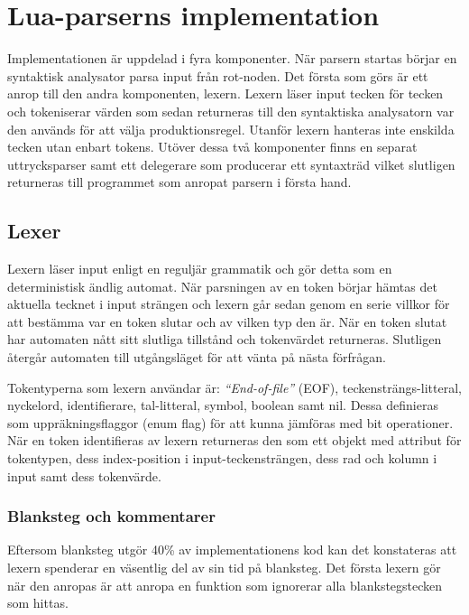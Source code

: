 \section{Lua-parserns implementation}

Implementationen är uppdelad i fyra komponenter. När parsern startas börjar
en syntaktisk analysator parsa input från rot-noden.  Det första som görs är
ett anrop till den andra komponenten, lexern. Lexern läser input tecken för
tecken och tokeniserar värden som sedan returneras till den syntaktiska
analysatorn var den används för att välja produktionsregel. Utanför lexern
hanteras inte enskilda tecken utan enbart tokens.  Utöver dessa två
komponenter finns en separat uttrycksparser samt ett delegerare som producerar
ett syntaxträd vilket slutligen returneras till programmet som anropat parsern
i första hand.

\subsection{Lexer}

Lexern läser input enligt en reguljär grammatik och gör detta som en
deterministisk ändlig automat. När parsningen av en token börjar hämtas det
aktuella tecknet i input strängen och lexern går sedan genom en serie villkor
för att bestämma var en token slutar och av vilken typ den är. När en token
slutat har automaten nått sitt slutliga tillstånd och tokenvärdet returneras.
Slutligen återgår automaten till utgångsläget för att vänta på nästa
förfrågan.

Tokentyperna som lexern användar är: \textit{``End-of-file''} (EOF),
teckensträngs-litteral, nyckelord, identifierare, tal-litteral, symbol,
boolean samt nil. Dessa definieras som uppräkningsflaggor (enum flag) för att
kunna jämföras med bit operationer. När en token identifieras av lexern
returneras den som ett objekt med attribut för tokentypen, dess index-position
i input-teckensträngen, dess rad och kolumn i input samt dess tokenvärde.

\subsubsection{Blanksteg och kommentarer}

Eftersom blanksteg utgör 40\% av implementationens kod kan det konstateras att
lexern spenderar en väsentlig del av sin tid på blanksteg. Det första lexern
gör när den anropas är att anropa en funktion som ignorerar alla
blankstegstecken som hittas.

